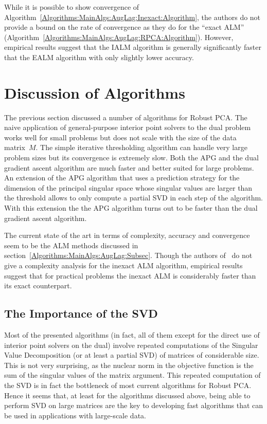 \documentclass{../../common/projectreport}
\begin{document}
While it is possible to show convergence of Algorithm~\ref{Algorithms:MainAlgs:AugLag:Inexact:Algorithm}, the authors do not provide a bound on the rate of convergence as they do for the ``exact ALM'' (Algorithm~\ref{Algorithms:MainAlgs:AugLag:RPCA:Algorithm}). However, empirical results suggest that the IALM algorithm is generally significantly faster that the EALM algorithm with only slightly lower accuracy. 



\section{Discussion of Algorithms}
\label{Algorithms:Discussion:Sec}

The previous section discussed a number of algorithms for Robust PCA. The naive application of general-purpose interior point solvers to the dual problem works well for small problems but does not scale with the size of the data matrix~$M$. The simple iterative thresholding algorithm can handle very large problem sizes but its convergence is extremely slow. Both the APG and the dual gradient ascent algorithm are much faster and better suited for large problems. An extension of the APG algorithm that uses a prediction strategy for the dimension of the principal singular space whose singular values are larger than the threshold allows to only compute a partial SVD in each step of the algorithm. With this extension the the APG algorithm turns out to be faster than the dual gradient ascent algorithm. 

The current state of the art in terms of complexity, accuracy and convergence seem to be the ALM methods discussed in section~\ref{Algorithms:MainAlgs:AugLag:Subsec}. Though the authors of~\cite{Lin:2010fk} do not give a complexity analysis for the inexact ALM algorithm, empirical results suggest that for practical problems the inexact ALM is considerably faster than its exact counterpart. 



\subsection{The Importance of the SVD}
\label{Algorithms:Discussion:SVD:Subsec}


Most of the presented algorithms (in fact, all of them except for the direct use of interior point solvers on the dual) involve repeated computations of the Singular Value Decomposition (or at least a partial SVD) of matrices of considerable size. This is not very surprising, as the nuclear norm in the objective function is the sum of the singular values of the matrix argument. This repeated computation of the SVD is in fact the bottleneck of most current algorithms for Robust PCA. Hence it seems that, at least for the algorithms discussed above, being able to perform SVD on large matrices are the key to developing fast algorithms that can be used in applications with large-scale data. 
\end{document}

